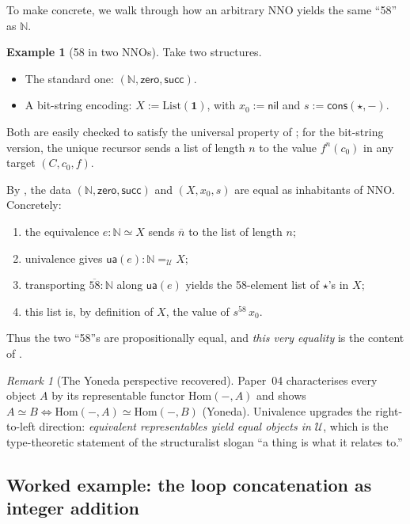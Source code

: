 \documentclass[12pt]{article}
\theoremstyle{definition}
\newtheorem{example}[theorem]{Example}
\theoremstyle{remark}
\newtheorem{remark}[theorem]{Remark}
\newcommand{\U}{\mathcal{U}}
\newcommand{\N}{\mathbb{N}}
\newcommand{\zero}{\mathsf{zero}}
\newcommand{\suc}{\mathsf{succ}}
\newcommand{\ua}{\mathsf{ua}}
\newcommand{\eqv}{\simeq}
\begin{document}
To make  concrete, we walk through how an
arbitrary NNO yields the same ``58'' as $\N$.

\begin{example}[58 in two NNOs]
\label{ex:58-two-nnos}
Take two structures.
\begin{itemize}
\item The standard one: $(\N, \zero, \suc)$.
\item A bit-string encoding: $X := \mathrm{List}(\mathbf{1})$, with
$x_0 := \mathsf{nil}$ and $s := \mathsf{cons}(\star, -)$.
\end{itemize}
Both are easily checked to satisfy the universal property of
; for the bit-string version, the unique recursor sends
a list of length $n$ to the value $f^n(c_0)$ in any target $(C, c_0, f)$.

By , the data $(\N, \zero, \suc)$ and
$(X, x_0, s)$ are equal as inhabitants of $\mathrm{NNO}$. Concretely:
\begin{enumerate}
\item the equivalence $e : \N \eqv X$ sends $\overline{n}$ to the list
of length $n$;
\item univalence gives $\ua(e) : \N =_\U X$;
\item transporting $\overline{58} : \N$ along $\ua(e)$ yields the
58-element list of $\star$'s in $X$;
\item this list is, by definition of $X$, the value of
$s^{58}\,x_0$.
\end{enumerate}
Thus the two ``58''s are propositionally equal, and \emph{this very
equality} is the content of .
\end{example}

\begin{remark}[The Yoneda perspective recovered]
\label{rem:yoneda-as-univalence}
Paper~04 characterises every object $A$ by its representable functor
$\mathrm{Hom}(-, A)$ and shows $A \simeq B \Leftrightarrow
\mathrm{Hom}(-, A) \simeq \mathrm{Hom}(-, B)$ (Yoneda). Univalence
upgrades the right-to-left direction: \emph{equivalent representables
yield equal objects in $\U$}, which is the type-theoretic statement of
the structuralist slogan ``a thing is what it relates to.''
\end{remark}

\subsection{Worked example: the loop concatenation as integer addition}
\label{sec:s1-example}
\end{document}
